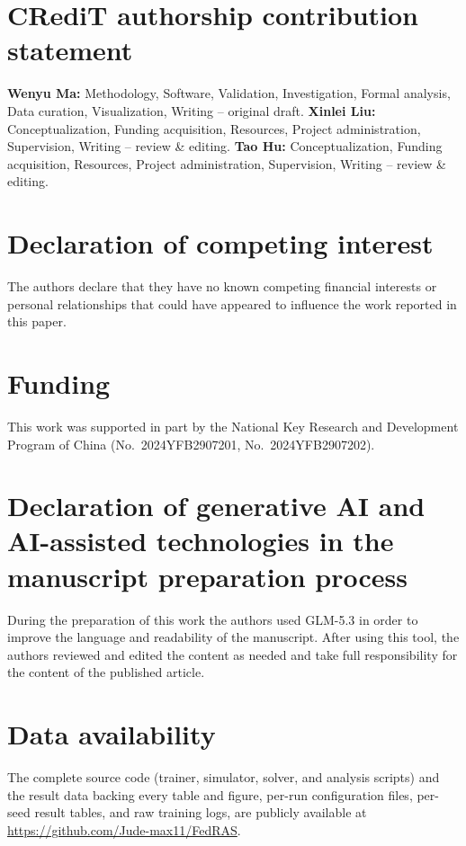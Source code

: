 \documentclass[a4paper,fleqn]{cas-dc}
\begin{document}
\section*{CRediT authorship contribution statement}
\textbf{Wenyu Ma:} Methodology, Software, Validation, Investigation, Formal analysis, Data curation, Visualization, Writing -- original draft.
\textbf{Xinlei Liu:} Conceptualization, Funding acquisition, Resources, Project administration, Supervision, Writing -- review \& editing.
\textbf{Tao Hu:} Conceptualization, Funding acquisition, Resources, Project administration, Supervision, Writing -- review \& editing.
\section*{Declaration of competing interest}
The authors declare that they have no known competing financial interests or personal relationships that could have appeared to influence the work reported in this paper.
\section*{Funding}
This work was supported in part by the National Key Research and Development Program of China (No.\ 2024YFB2907201, No.\ 2024YFB2907202).
\section*{Declaration of generative AI and AI-assisted technologies in the manuscript preparation process}
During the preparation of this work the authors used GLM-5.3 in order to improve the language and readability of the manuscript. After using this tool, the authors reviewed and edited the content as needed and take full responsibility for the content of the published article.
\section*{Data availability}
The complete source code (trainer, simulator, solver, and analysis scripts) and the result data backing every table and figure, per-run configuration files, per-seed result tables, and raw training logs, are publicly available at \url{https://github.com/Jude-max11/FedRAS}.


\end{document}
